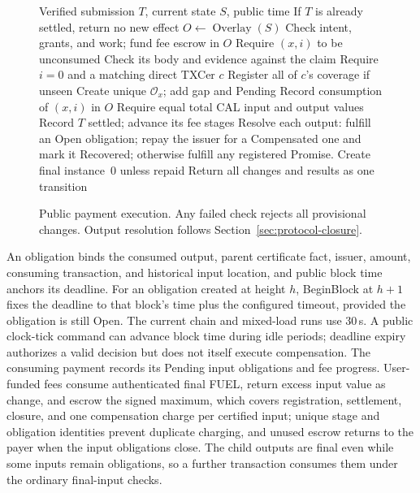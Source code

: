 \begin{figure}[t]
  \small
  \begin{algorithmic}[1]
    \REQUIRE Verified submission $T$, current state $S$, public time
    \STATE If $T$ is already settled, return no new effect
    \STATE $O\gets\operatorname{Overlay}(S)$
    \STATE Check intent, grants, and work; fund fee escrow in $O$
      \STATE Require $(x,i)$ to be unconsumed
        \STATE Check its body and evidence against the claim
      \ELSE
        \STATE Require $i=0$ and a matching direct TXCer $c$
        \STATE Register all of $c$'s coverage if unseen
        \STATE Create unique $\mathcal{O}_x$; add gap and Pending
      \ENDIF
      \STATE Record consumption of $(x,i)$ in $O$
    \ENDFOR
    \STATE Require equal total CAL input and output values
    \STATE Record $T$ settled; advance its fee stages
    \STATE Resolve each output: fulfill an Open obligation; repay the
    issuer for a Compensated one and mark it Recovered; otherwise fulfill
    any registered Promise. Create final instance~0 unless repaid
    \STATE Return all changes and results as one transition
  \end{algorithmic}
  \caption{Public payment execution. Any failed check rejects all
    provisional changes. Output resolution follows
    Section~\ref{sec:protocol-closure}.}
  \label{fig:protocol-payment}
\end{figure}

An obligation binds the consumed output, parent certificate fact, issuer, amount, consuming transaction, and historical input location, and public block time anchors its deadline. For an obligation created at height $h$, BeginBlock at $h+1$ fixes the deadline to that block's time plus the configured timeout, provided the obligation is still Open. The current chain and mixed-load runs use 30\,s. A public clock-tick command can advance block time during idle periods; deadline expiry authorizes a valid decision but does not itself execute compensation. The consuming payment records its Pending input obligations and fee progress. User-funded fees consume authenticated final FUEL, return excess input value as change, and escrow the signed maximum, which covers registration, settlement, closure, and one compensation charge per certified input; unique stage and obligation identities prevent duplicate charging, and unused escrow returns to the payer when the input obligations close. The child outputs are final even while some inputs remain obligations, so a further transaction consumes them under the ordinary final-input checks.
